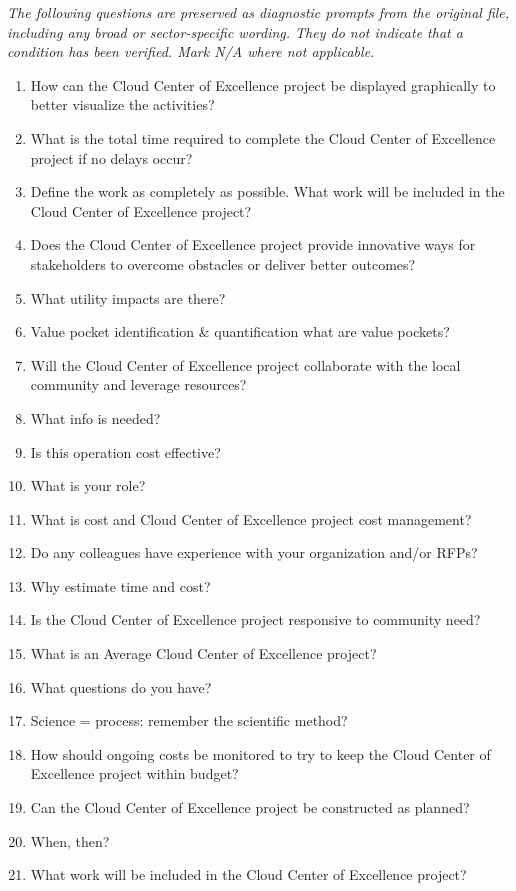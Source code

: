 \documentclass[10pt,letterpaper]{article}
\newcommand{\docsection}[1]{\par\Needspace{5\baselineskip}\vspace{8pt}{\large\sffamily\bfseries\color{navy}#1}\par\vspace{2pt}{\color{rulegrey}\rule{\linewidth}{.6pt}}\par}
\begin{document}
\docsection{03 \quad Source diagnostic checklist}
\textit{The following questions are preserved as diagnostic prompts from the original file, including any broad or sector-specific wording. They do not indicate that a condition has been verified. Mark N/A where not applicable.}
\begingroup\small\begin{enumerate}[leftmargin=2.1em, itemsep=4pt]
\item[1.] How can the Cloud Center of Excellence project be displayed graphically to better visualize the activities?
\item[2.] What is the total time required to complete the Cloud Center of Excellence project if no delays occur?
\item[3.] Define the work as completely as possible. What work will be included in the Cloud Center of Excellence project?
\item[4.] Does the Cloud Center of Excellence project provide innovative ways for stakeholders to overcome obstacles or deliver better outcomes?
\item[5.] What utility impacts are there?
\item[6.] Value pocket identification \& quantification what are value pockets?
\item[7.] Will the Cloud Center of Excellence project collaborate with the local community and leverage resources?
\item[8.] What info is needed?
\item[9.] Is this operation cost effective?
\item[10.] What is your role?
\item[11.] What is cost and Cloud Center of Excellence project cost management?
\item[12.] Do any colleagues have experience with your organization and/or RFPs?
\item[13.] Why estimate time and cost?
\item[14.] Is the Cloud Center of Excellence project responsive to community need?
\item[15.] What is an Average Cloud Center of Excellence project?
\item[16.] What questions do you have?
\item[17.] Science = process: remember the scientific method?
\item[18.] How should ongoing costs be monitored to try to keep the Cloud Center of Excellence project within budget?
\item[19.] Can the Cloud Center of Excellence project be constructed as planned?
\item[20.] When, then?
\item[21.] What work will be included in the Cloud Center of Excellence project?
\end{enumerate}\endgroup
\end{document}
